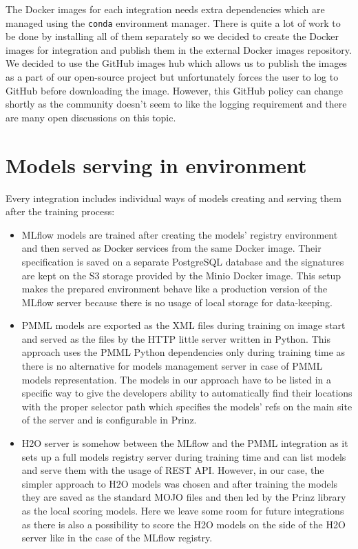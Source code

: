 The Docker images for each integration needs extra dependencies which are managed using the \texttt{conda}
environment manager. There is quite a lot of work to be done by installing all of them separately
so we decided to create the Docker images for integration and publish them in the external Docker
images repository. We decided to use the GitHub images hub which allows us to publish the images
as a part of our open-source project but unfortunately forces the user to log to GitHub before
downloading the image. However, this GitHub policy can change shortly as the community
doesn’t seem to like the logging requirement and there are many open discussions on this topic.

\section{Models serving in environment}

Every integration includes individual ways of models creating and serving them after the training process:

\begin{itemize}
    \item MLflow models are trained after creating the models' registry environment and then served as
    Docker services from the same Docker image. Their specification is saved on a separate PostgreSQL database and the signatures are kept on the S3 storage provided by the Minio Docker image. This setup
    makes the prepared environment behave like a production version of the MLflow server because there is no
    usage of local storage for data-keeping.

    \item PMML models are exported as the XML files during training on image start and served as the files by the HTTP little server written in Python. This approach uses the PMML Python dependencies only during
    training time as there is no alternative for models management server in case of PMML models representation.
    The models in our approach have to be listed in a specific way to give the developers ability to
    automatically find their locations with the proper selector path which specifies the models’ refs on the
    main site of the server and is configurable in Prinz.

    \item H2O server is somehow between the MLflow and the PMML integration as it sets up a full models registry server during training time and can list models and serve them with the usage of REST API. However, in our case, the simpler approach to H2O models was chosen and after training the models they are saved as the standard MOJO files and then led by the Prinz library as the local scoring models. Here we leave some room for future integrations as there is also a possibility to score the H2O models on the side of the H2O server like in the case of the MLflow registry.
\end{itemize}

